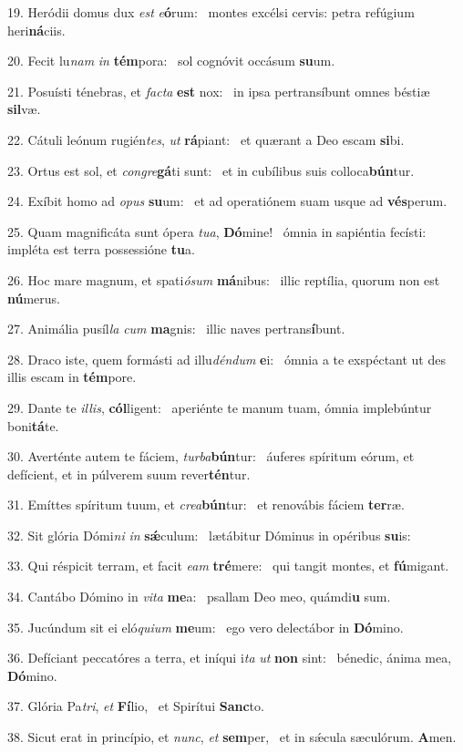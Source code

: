 19. Heródii domus dux \textit{est} \textit{e}\textbf{ó}rum: \ast\  montes excélsi cervis: petra refúgium heri\textbf{ná}ciis.\

20. Fecit lu\textit{nam} \textit{in} \textbf{tém}pora: \ast\  sol cognóvit occásum \textbf{su}um.\

21. Posuísti ténebras, et \textit{fac}\textit{ta} \textbf{est} nox: \ast\  in ipsa pertransíbunt omnes béstiæ \textbf{sil}væ.\

22. Cátuli leónum rugién\textit{tes}, \textit{ut} \textbf{rá}piant: \ast\  et quærant a Deo escam \textbf{si}bi.\

23. Ortus est sol, et \textit{con}\textit{gre}\textbf{gá}ti sunt: \ast\  et in cubílibus suis colloca\textbf{bún}tur.\

24. Exíbit homo ad \textit{o}\textit{pus} \textbf{su}um: \ast\  et ad operatiónem suam usque ad \textbf{vés}perum.\

25. Quam magnificáta sunt ópera \textit{tu}\textit{a}, \textbf{Dó}mine! \ast\  ómnia in sapiéntia fecísti: impléta est terra possessióne \textbf{tu}a.\

26. Hoc mare magnum, et spati\textit{ó}\textit{sum} \textbf{má}nibus: \ast\  illic reptília, quorum non est \textbf{nú}merus.\

27. Animália pusíl\textit{la} \textit{cum} \textbf{ma}gnis: \ast\  illic naves pertrans\textbf{í}bunt.\

28. Draco iste, quem formásti ad illu\textit{dén}\textit{dum} \textbf{e}i: \ast\  ómnia a te exspéctant ut des illis escam in \textbf{tém}pore.\

29. Dante te \textit{il}\textit{lis}, \textbf{cól}ligent: \ast\  aperiénte te manum tuam, ómnia implebúntur boni\textbf{tá}te.\

30. Averténte autem te fáciem, \textit{tur}\textit{ba}\textbf{bún}tur: \ast\  áuferes spíritum eórum, et defícient, et in púlverem suum rever\textbf{tén}tur.\

31. Emíttes spíritum tuum, et \textit{cre}\textit{a}\textbf{bún}tur: \ast\  et renovábis fáciem \textbf{ter}ræ.\

32. Sit glória Dómi\textit{ni} \textit{in} \textbf{sǽ}culum: \ast\  lætábitur Dóminus in opéribus \textbf{su}is:\

33. Qui réspicit terram, et facit \textit{e}\textit{am} \textbf{tré}mere: \ast\  qui tangit montes, et \textbf{fú}migant.\

34. Cantábo Dómino in \textit{vi}\textit{ta} \textbf{me}a: \ast\  psallam Deo meo, quámdi\textbf{u} sum.\

35. Jucúndum sit ei eló\textit{qui}\textit{um} \textbf{me}um: \ast\  ego vero delectábor in \textbf{Dó}mino.\

36. Defíciant peccatóres a terra, et iníqui i\textit{ta} \textit{ut} \textbf{non} sint: \ast\  bénedic, ánima mea, \textbf{Dó}mino.\

37. Glória Pa\textit{tri}, \textit{et} \textbf{Fí}lio, \ast\  et Spirítui \textbf{Sanc}to.\

38. Sicut erat in princípio, et \textit{nunc}, \textit{et} \textbf{sem}per, \ast\  et in sǽcula sæculórum. \textbf{A}men.\

